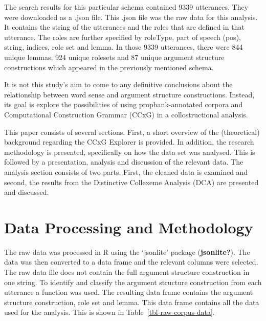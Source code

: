 \documentclass[
  letterpaper,
  DIV=11,
  numbers=noendperiod]{scrartcl}
\begin{document}
The search results for this particular schema contained 9339 utterances.
They were downloaded as a .json file. This .json file was the raw data
for this analysis. It contains the string of the utterances and the
roles that are defined in that utterance. The roles are further
specified by roleType, part of speech (pos), string, indices, role set
and lemma. In those 9339 utterances, there were 844 unique lemmas, 924
unique rolesets and 87 unique argument structure constructions which
appeared in the previously mentioned schema.

It is not this study's aim to come to any definitive conclusions about
the relationship between word sense and argument structure
constructions. Instead, its goal is explore the possibilities of using
propbank-annotated corpora and Computational Construction Grammar (CCxG)
in a collostructional analysis.

This paper consists of several sections. First, a short overview of the
(theoretical) background regarding the CCxG Explorer is provided. In
addition, the research methodology is presented, specifically on how the
data set was analysed. This is followed by a presentation, analysis and
discussion of the relevant data. The analysis section consists of two
parts. First, the cleaned data is examined and second, the results from
the Distinctive Collexeme Analysis (DCA) are presented and discussed.

\hypertarget{data-processing-and-methodology}{%
\section{Data Processing and
Methodology}\label{data-processing-and-methodology}}

The raw data was processed in R using the `jsonlite' package
(\textbf{jsonlite?}). The data was then converted to a data frame and
the relevant columns were selected. The raw data file does not contain
the full argument structure construction in one string. To identify and
classify the argument structure construction from each utterance a
function was used. The resulting data frame contains the argument
structure construction, role set and lemma. This data frame contains all
the data used for the analysis. This is shown in
Table~\ref{tbl-raw-corpus-data}.
\end{document}
